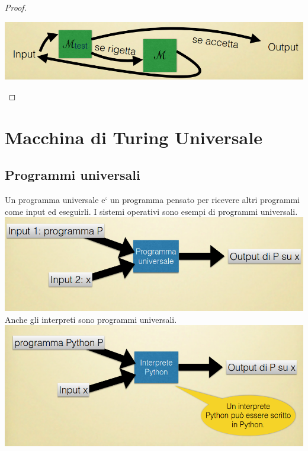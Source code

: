 \documentclass[a4paper, 12pt]{article}
\begin{document}
\begin{proof}
\begin{enumerate}
\begin{itemize}
	\begin{center}
	\includegraphics[scale=0.4]{while3.png}
	\end{center}
	\end{itemize}
\end{enumerate}
\end{proof}
\newpage
\section{Macchina di Turing Universale}
\subsection{Programmi universali} 
Un programma universale e` un programma pensato per ricevere altri programmi come input ed eseguirli. I sistemi operativi sono esempi di programmi universali.\\
\includegraphics[scale=0.5]{programmi_universali.png}
Anche gli interpreti sono programmi universali.\\
\includegraphics[scale=0.5]{interpreti_programmi_universali.png}
\end{document}
